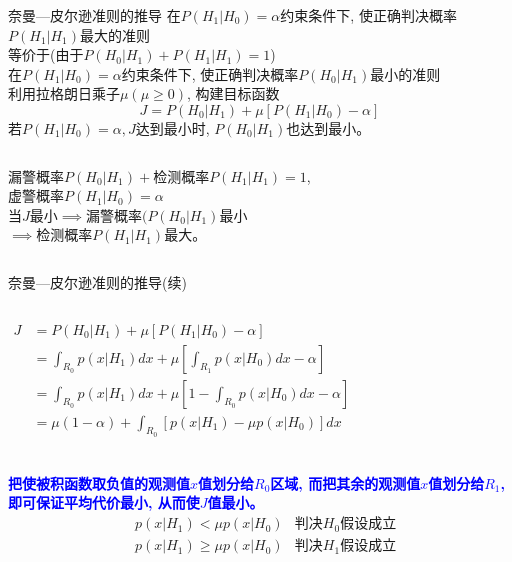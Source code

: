 \begin{frame}[shrink]{奈曼---皮尔逊准则的推导}
在$P(H_1|H_0)=\alpha$约束条件下, 使正确判决概率$P(H_1|H_1)$最大的准则\\
\qquad 等价于(由于$P(H_0|H_1)+P(H_1|H_1)=1$)\\
在$P(H_1|H_0)=\alpha$约束条件下, 使正确判决概率$P(H_0|H_1)$最小的准则\\
利用拉格朗日乘子$\mu(\mu\ge 0)$, 构建目标函数
\[ J=P(H_0|H_1)+\mu\left[P(H_1|H_0)-\alpha\right]\]
若$P(H_1|H_0)=\alpha, J$达到最小时, $P(H_0|H_1)$也达到最小。
\begin{columns}
	\scriptsize
	漏警概率$P(H_0|H_1)+$检测概率$P(H_1|H_1)=1$,\\ 虚警概率$P(H_1|H_0)=\alpha$\\
	当$J$最小$\implies$漏警概率$(P(H_0|H_1)$最小\\
	$\implies$检测概率$P(H_1|H_1)$最大。
	\leftline{\texttt{[image: R0R1]}}
\end{columns}
\end{frame}

\begin{frame}[shrink]{奈曼---皮尔逊准则的推导(续)}
\begin{columns}
	\begin{align*}
	J&=P(H_0|H_1)+\mu[P(H_1|H_0)-\alpha]\\
	&=\int_{R_0}p(x|H_1)dx+\mu\left[\int_{R_1}p(x|H_0)dx-\alpha\right]\\
	&=\int_{R_0}p(x|H_1)dx+\mu\left[1-\int_{R_0}p(x|H_0)dx-\alpha\right]\\
	&=\mu(1-\alpha)+\int_{R_0}\left[p(x|H_1)-\mu p(x|H_0)\right]dx \\
	\end{align*}
	\leftline{\texttt{[image: R0R1]}}
\end{columns}
\textbf{\textcolor{blue}{把使被积函数取负值的观测值$x$值划分给$R_0$区域, 而把其余的观测值$x$值划分给$R_1$, 即可保证平均代价最小, 从而使$J$值最小。}}
\begin{align*}
&p(x|H_1)< \mu p(x|H_0)&\textbf{判决$H_0$假设成立}\\
&p(x|H_1)\ge \mu p(x|H_0)&\textbf{判决$H_1$假设成立}
\end{align*}
\end{frame}

